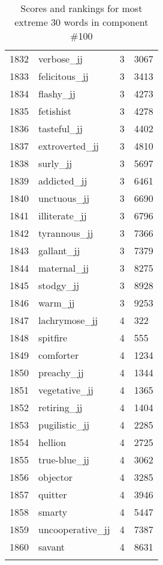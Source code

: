 \begin{longtable}[!htbp]{| rlr@{.}l |}
    1832 & verbose\_jj & 3 & 3067 \\
    1833 & felicitous\_jj & 3 & 3413 \\
    1834 & flashy\_jj & 3 & 4273 \\
    1835 & fetishist & 3 & 4278 \\
    1836 & tasteful\_jj & 3 & 4402 \\
    1837 & extroverted\_jj & 3 & 4810 \\
    1838 & surly\_jj & 3 & 5697 \\
    1839 & addicted\_jj & 3 & 6461 \\
    1840 & unctuous\_jj & 3 & 6690 \\
    1841 & illiterate\_jj & 3 & 6796 \\
    1842 & tyrannous\_jj & 3 & 7366 \\
    1843 & gallant\_jj & 3 & 7379 \\
    1844 & maternal\_jj & 3 & 8275 \\
    1845 & stodgy\_jj & 3 & 8928 \\
    1846 & warm\_jj & 3 & 9253 \\
    1847 & lachrymose\_jj & 4 & 322 \\
    1848 & spitfire & 4 & 555 \\
    1849 & comforter & 4 & 1234 \\
    1850 & preachy\_jj & 4 & 1344 \\
    1851 & vegetative\_jj & 4 & 1365 \\
    1852 & retiring\_jj & 4 & 1404 \\
    1853 & pugilistic\_jj & 4 & 2285 \\
    1854 & hellion & 4 & 2725 \\
    1855 & true-blue\_jj & 4 & 3062 \\
    1856 & objector & 4 & 3285 \\
    1857 & quitter & 4 & 3946 \\
    1858 & smarty & 4 & 5447 \\
    1859 & uncooperative\_jj & 4 & 7387 \\
    1860 & savant & 4 & 8631 \\
    \hline
    \caption{Scores and rankings for most extreme 30 words in component \#100} \\
\end{longtable}

